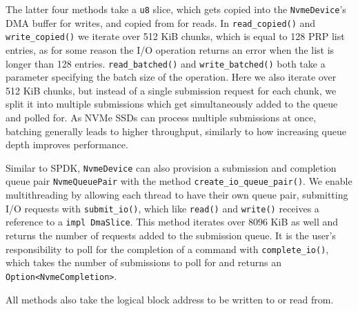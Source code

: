 The latter four methods take a \texttt{u8} slice, which gets copied into the \texttt{NvmeDevice}'s DMA buffer for writes, and copied from for reads. In \texttt{read\_copied()} and \texttt{write\_copied()} we iterate over 512 KiB chunks, which is equal to 128 PRP list entries, as for some reason the I/O operation returns an error when the list is longer than 128 entries. \texttt{read\_batched()} and \texttt{write\_batched()} both take a parameter specifying the batch size of the operation. Here we also iterate over 512 KiB chunks, but instead of a single submission request for each chunk, we split it into multiple submissions which get simultaneously added to the queue and polled for. As NVMe SSDs can process multiple submissions at once, batching generally leads to higher throughput, similarly to how increasing queue depth improves performance.

Similar to SPDK, \texttt{NvmeDevice} can also provision a submission and completion queue pair \texttt{NvmeQueuePair} with the method \texttt{create\_io\_queue\_pair()}. We enable multithreading by allowing each thread to have their own queue pair, submitting I/O requests with \texttt{submit\_io()}, which like \texttt{read()} and \texttt{write()} receives a reference to a \texttt{impl DmaSlice}. This method iterates over 8096 KiB as well and returns the number of requests added to the submission queue. It is the user's responsibility to poll for the completion of a command with \texttt{complete\_io()}, which takes the number of submissions to poll for and returns an \texttt{Option<NvmeCompletion>}.

All methods also take the logical block address to be written to or read from.
